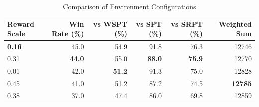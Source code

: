 \begin{table}[htbp]%
\centering%
\begin{tabular}{lrrrrr}%
\toprule%
\textbf{Reward Scale}&\textbf{Win Rate (\%)}&\textbf{vs WSPT (\%)}&\textbf{vs SPT (\%)}&\textbf{vs SRPT (\%)}&\textbf{Weighted Sum}\\%
\midrule%
\textbf{0.16}&45.0&54.9&91.8&76.3&12746\\%
0.31&\textbf{44.0}&55.0&\textbf{88.0}&\textbf{75.9}&12770\\%
0.01&42.0&\textbf{51.2}&91.3&75.0&12828\\%
0.45&41.0&51.2&87.2&74.5&\textbf{12785}\\%
0.38&37.0&47.4&86.0&69.8&12859\\%
\bottomrule%
\end{tabular}%
\caption{Comparison of Environment Configurations}%
\label{tab:environment}%
\end{table}